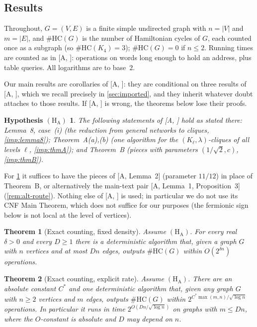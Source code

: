 \documentclass[11pt]{amsart}
\theoremstyle{plain}
\newtheorem{theorem}{Theorem}[section]
\newtheorem*{hypA}{Hypothesis $(\mathrm{H}_{\mathrm{A}})$}
\theoremstyle{definition}
\theoremstyle{remark}
\numberwithin{equation}{section}
\newcommand{\HC}{\#\mathrm{HC}}
\newcommand{\A}[1][]{\textup{[A\if\relax\detokenize{#1}\relax\else, #1\fi]}}
\begin{document}
\subsection{Results}
Throughout, $G=(V,E)$ is a finite simple undirected graph with $n=|V|$ and $m=|E|$, and
$\HC(G)$ is the number of Hamiltonian cycles of $G$, each counted once as a subgraph (so
$\HC(K_4)=3$); $\HC(G)=0$ if $n\le 2$. Running times are counted as in \A: operations on words
long enough to hold an address, plus table queries. All logarithms are to base~$2$.

Our main results are corollaries of \A: they are conditional on three results of \A, which we
recall precisely in \cref{sec:imported}, and they inherit whatever doubt attaches to those
results. If \A{} is wrong, the theorems below lose their proofs.

\begin{hypA}
The following statements of \A{} hold as stated there: Lemma~8, case~(i) (the reduction from
general networks to cliques, \cref{imp:lemma8}); Theorem~A(a),(b) (one algorithm for the
$(K_\ell,\lambda)$-cliques of all levels $\ell$, \cref{imp:thmA}); and Theorem~B (pieces with
parameters $(1/\sqrt2,c)$, \cref{imp:thmB}).
\end{hypA}

For \cref{thm:main-delta} it suffices to have the pieces of \A[Lemma~2] (parameter $11/12$) in
place of Theorem~B, or alternatively the main-text pair \A[Lemma~1, Proposition~3]
(\cref{rem:alt-route}). Nothing else of \A{} is used; in particular we do not use its CNF Main
Theorem, which does not suffice for our purposes (the fermionic sign below is not local at the
level of vertices).

\begin{theorem}[Exact counting, fixed density]\label{thm:main-delta}
Assume $(\mathrm{H}_{\mathrm{A}})$. For every real $\delta>0$ and every $D\ge1$ there is a
deterministic algorithm that, given a graph $G$ with $n$ vertices and at most $Dn$ edges,
outputs $\HC(G)$ within $O(2^{\delta n})$ operations.
\end{theorem}

\begin{theorem}[Exact counting, explicit rate]\label{thm:main-rate}
Assume $(\mathrm{H}_{\mathrm{A}})$. There are an absolute constant $C^{*}$ and one deterministic
algorithm that, given any graph $G$ with $n\ge2$ vertices and $m$ edges, outputs $\HC(G)$
within $2^{C^{*}\max(m,n)/\sqrt{\log n}}$ operations. In particular it runs in time
$2^{O(Dn/\sqrt{\log n})}$ on graphs with $m\le Dn$, where the $O$-constant is absolute and $D$
may depend on $n$.
\end{theorem}
\end{document}
